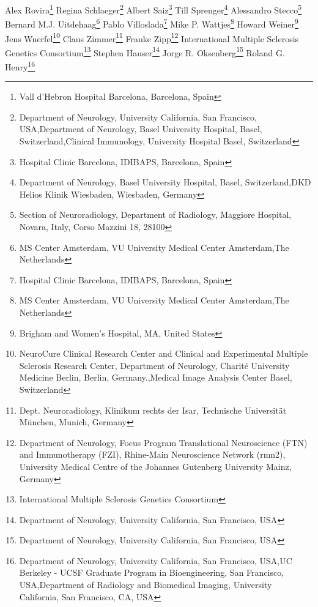 Alex Rovira\footnote[10]{Vall d’Hebron Hospital Barcelona, Barcelona, Spain}
Regina Schlaeger\footnote[1,6,8]{Department of Neurology, University California, San Francisco,  USA,Department of Neurology, Basel University Hospital, Basel, Switzerland,Clinical Immunology, University Hospital Basel, Switzerland}
Albert Saiz\footnote[22]{Hospital Clinic Barcelona, IDIBAPS, Barcelona, Spain}
Till Sprenger\footnote[6,25]{Department of Neurology, Basel University Hospital, Basel, Switzerland,DKD Helios Klinik Wiesbaden, Wiesbaden, Germany}
Alessandro Stecco\footnote[26]{Section of Neuroradiology, Department of Radiology, Maggiore Hospital, Novara, Italy, Corso Mazzini 18, 28100}
Bernard M.J. Uitdehaag\footnote[27]{MS Center Amsterdam, VU University Medical Center Amsterdam,The Netherlands}
Pablo Villoslada\footnote[22]{Hospital Clinic Barcelona, IDIBAPS, Barcelona, Spain}
Mike P. Wattjes\footnote[27]{MS Center Amsterdam, VU University Medical Center Amsterdam,The Netherlands}
Howard Weiner\footnote[7]{Brigham and Women's Hospital, MA, United States}
Jens Wuerfel\footnote[3,28]{NeuroCure Clinical Research Center and Clinical and Experimental Multiple Sclerosis Research Center, Department of Neurology, Charité University Medicine Berlin, Berlin, Germany.,Medical Image Analysis Center Basel, Switzerland}
Claus Zimmer\footnote[29]{Dept. Neuroradiology, Klinikum rechts der Isar, Technische Universität München, Munich, Germany}
Frauke Zipp\footnote[17]{Department of Neurology, Focus Program Translational Neuroscience (FTN) and Immunotherapy (FZI), Rhine-Main Neuroscience Network (rmn2), University Medical Centre of the Johannes Gutenberg University Mainz, Germany}
International Multiple Sclerosis Genetics Consortium\footnote[30]{International Multiple Sclerosis Genetics Consortium}
Stephen Hauser\footnote[1]{Department of Neurology, University California, San Francisco,  USA}
Jorge R. Oksenberg\footnote[1]{Department of Neurology, University California, San Francisco,  USA}
Roland G. Henry\footnote[1,2,11]{Department of Neurology, University California, San Francisco,  USA,UC Berkeley - UCSF Graduate Program in Bioengineering, San Francisco, USA,Department of Radiology and Biomedical Imaging, University California, San Francisco, CA, USA}

\else %

